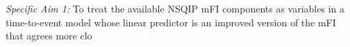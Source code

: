 \emph{Specific Aim 1:} To treat the available NSQIP mFI components as variables in a time-to-event model whose linear predictor is an improved version of the mFI that agrees more clo